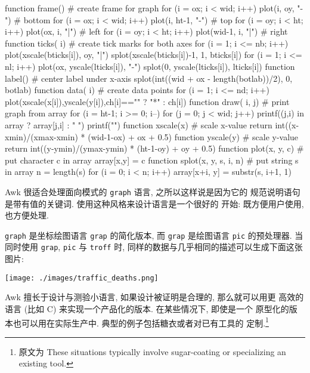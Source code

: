 \begin{awkcode}
    function frame() {        # create frame for graph
        for (i = ox; i < wid; i++) plot(i, oy, "-")     # bottom
        for (i = ox; i < wid; i++) plot(i, ht-1, "-")   # top
        for (i = oy; i < ht; i++) plot(ox, i, "|")      # left
        for (i = oy; i < ht; i++) plot(wid-1, i, "|")   # right
    }
    function ticks(    i) {   # create tick marks for both axes
        for (i = 1; i <= nb; i++) {
            plot(xscale(bticks[i]), oy, "|")
            splot(xscale(bticks[i])-1, 1, bticks[i])
        }
        for (i = 1; i <= nl; i++) {
            plot(ox, yscale(lticks[i]), "-")
            splot(0, yscale(lticks[i]), lticks[i])
        }
    }
    function label() {        # center label under x-axis
        splot(int((wid + ox - length(botlab))/2), 0, botlab)
    }
    function data(    i) {    # create data points
        for (i = 1; i <= nd; i++)
            plot(xscale(x[i]),yscale(y[i]),ch[i]=="" ? "*" : ch[i])
    }
    function draw(    i, j) { # print graph from array
        for (i = ht-1; i >= 0; i--) {
            for (j = 0; j < wid; j++)
                printf((j,i) in array ? array[j,i] : " ")
            printf("\n")
        }
    }
    function xscale(x) {      # scale x-value
        return int((x-xmin)/(xmax-xmin) * (wid-1-ox) + ox + 0.5)
    }
    function yscale(y) {      # scale y-value
        return int((y-ymin)/(ymax-ymin) * (ht-1-oy) + oy + 0.5)
    }
    function plot(x, y, c) {  # put character c in array
        array[x,y] = c
    }
    function splot(x, y, s,    i, n) { # put string s in array
        n = length(s)
        for (i = 0; i < n; i++)
            array[x+i, y] = substr(s, i+1, 1)
    }
\end{awkcode}

Awk 很适合处理面向模式的 \texttt{graph} 语言, 之所以这样说是因为它的
规范说明语句是带有值的关键词. 使用这种风格来设计语言是一个很好的
开始: 既方便用户使用, 也方便处理.

\texttt{graph} 是坐标绘图语言 \texttt{grap} 的简化版本, 而 \texttt{grap}
是绘图语言 \texttt{pic} 的预处理器.
 当同时使用 \texttt{grap}, \texttt{pic} 与 \texttt{troff}
时, 同样的数据与几乎相同的描述可以生成下面这张图片:
\begin{center}
    \texttt{[image: ./images/traffic\_deaths.png]}
\end{center}

Awk 擅长于设计与测验小语言, 如果设计被证明是合理的, 那么就可以用更
高效的语言 (比如 C) 来实现一个产品化的版本. 在某些情况下, 即使是一个
原型化的版本也可以用在实际生产中. 典型的例子包括糖衣或者对已有工具的
定制.\footnote{原文为 These situations typically involve sugar-coating or
specializing an existing tool.}

